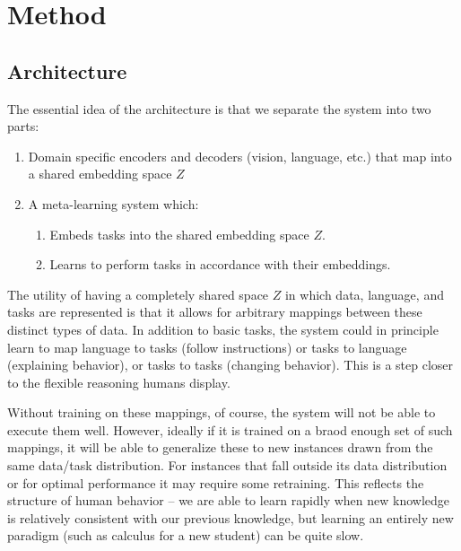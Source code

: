 \documentclass{article}
\begin{document}
\section{Method}
\subsection{Architecture}
The essential idea of the architecture is that we separate the system into two parts: 
\begin{enumerate}
\item Domain specific encoders and decoders (vision, language, etc.) that map into a shared embedding space $Z$
\item A meta-learning system which:
    \begin{enumerate}
    \item Embeds tasks into the shared embedding space $Z$.
    \item Learns to perform tasks in accordance with their embeddings.
    \end{enumerate}
\end{enumerate}
The utility of having a completely shared space $Z$ in which data, language, and tasks are represented is that it allows for arbitrary mappings between these distinct types of data. In addition to basic tasks, the system could in principle learn to map language to tasks (follow instructions) or tasks to language (explaining behavior), or tasks to tasks (changing behavior). This is a step closer to the flexible reasoning humans display. \par
Without training on these mappings, of course, the system will not be able to execute them well. However, ideally if it is trained on a braod enough set of such mappings, it will be able to generalize these to new instances drawn from the same data/task distribution. For instances that fall outside its data distribution or for optimal performance it may require some retraining. This reflects the structure of human behavior -- we are able to learn rapidly when new knowledge is relatively consistent with our previous knowledge, but learning an entirely new paradigm (such as calculus for a new student) can be quite slow. \par 
\end{document}
